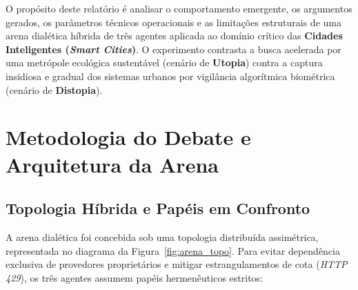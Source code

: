 \documentclass[runningheads]{llncs}
\begin{document}
O prop\'osito deste relat\'orio \'e analisar o comportamento emergente, os argumentos gerados, os par\^ametros t\'ecnicos operacionais e as limita\c{c}\~oes estruturais de uma arena dial\'etica híbrida de tr\^es agentes aplicada ao dom\'inio cr\'itico das \textbf{Cidades Inteligentes (\emph{Smart Cities})}. O experimento contrasta a busca acelerada por uma metr\'opole ecol\'ogica sustent\'avel (cen\'ario de \textbf{Utopia}) contra a captura insidiosa e gradual dos sistemas urbanos por vigil\^ancia algor\'itmica biom\'etrica (cen\'ario de \textbf{Distopia}). 

\section{Metodologia do Debate e Arquitetura da Arena}

\subsection{Topologia H\'ibrida e Pap\'eis em Confronto}

A arena dial\'etica foi concebida sob uma topologia distribu\'ida assim\'etrica, representada no diagrama da Figura~\ref{fig:arena_topo}. Para evitar depend\^encia exclusiva de provedores propriet\'arios e mitigar estrangulamentos de cota (\emph{HTTP 429}), os tr\^es agentes assumem pap\'eis hermen\^euticos estritos:
\end{document}
